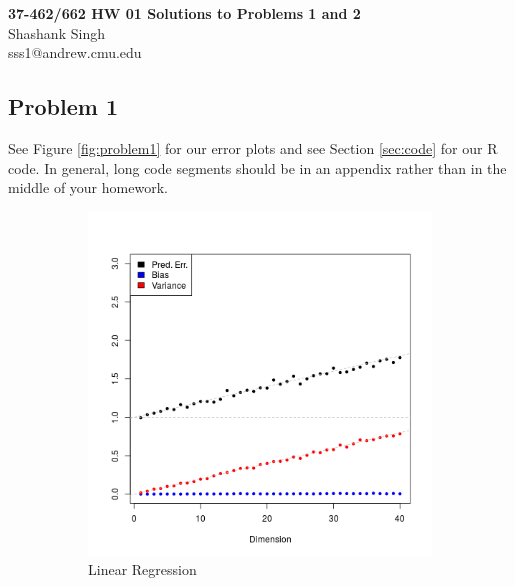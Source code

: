 \documentclass[12pt]{article}
\begin{document}
\begin{center}
{\bf\Large 37-462/662 HW 01 Solutions to Problems 1 and 2}\\
Shashank Singh\\
sss1@andrew.cmu.edu\\
\end{center}


\subsection{Problem 1}
See Figure \ref{fig:problem1} for our error plots and see Section
\ref{sec:code} for our R code. In general, long code segments should be in an
appendix rather than in the middle of your homework.
\begin{figure}[h!]
\centering
\hfill
  \begin{subfigure}[b]{0.49\textwidth}
  \includegraphics[width=1.05\textwidth]{linear}
  \vspace{-8mm}
  \caption{Linear Regression}
  \end{subfigure}
\hfill
  \begin{subfigure}[b]{0.49\textwidth}

\end{subfigure}
\end{figure}
\end{document}
